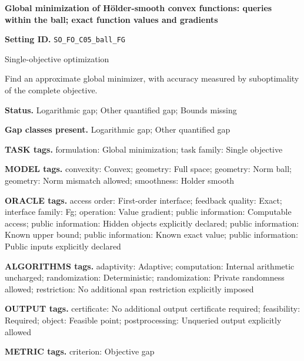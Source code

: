 \documentclass[10pt,a4paper]{article}
\begin{document}
\raggedright

{\LARGE\bfseries\sffamily\color{AtlasNavy} Global minimization of Hölder-smooth convex functions: queries within the ball; exact function values and gradients\par}\vspace{5pt}


\textbf{Setting ID.} \texttt{SO\_\allowbreak{}FO\_\allowbreak{}C05\_\allowbreak{}ball\_\allowbreak{}FG}



Single-objective optimization



Find an approximate global minimizer, with accuracy measured by suboptimality of the complete objective.



\textbf{Status.} Logarithmic gap; Other quantified gap; Bounds missing



\textbf{Gap classes present.} Logarithmic gap; Other quantified gap



\textbf{TASK tags.} formulation: Global minimization; task family: Single objective



\textbf{MODEL tags.} convexity: Convex; geometry: Full space; geometry: Norm ball; geometry: Norm mismatch allowed; smoothness: Holder smooth



\textbf{ORACLE tags.} access order: First-order interface; feedback quality: Exact; interface family: Fg; operation: Value gradient; public information: Computable access; public information: Hidden objects explicitly declared; public information: Known upper bound; public information: Known exact value; public information: Public inputs explicitly declared



\textbf{ALGORITHMS tags.} adaptivity: Adaptive; computation: Internal arithmetic uncharged; randomization: Deterministic; randomization: Private randomness allowed; restriction: No additional span restriction explicitly imposed



\textbf{OUTPUT tags.} certificate: No additional output certificate required; feasibility: Required; object: Feasible point; postprocessing: Unqueried output explicitly allowed



\textbf{METRIC tags.} criterion: Objective gap
\end{document}
